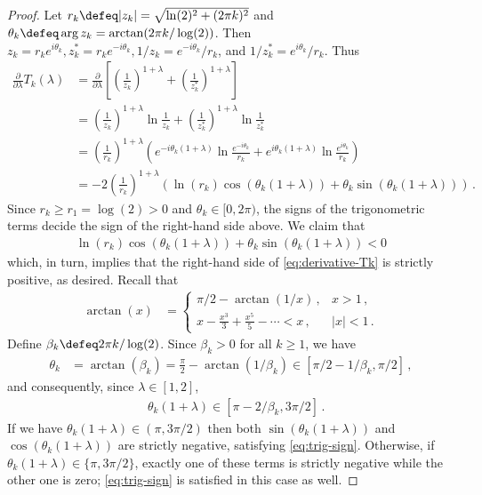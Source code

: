 \begin{proof}
    Let $r_k \defeq \vert z_k \vert = \sqrt{\ln(2)^2 + (2 \pi k)^2}$ and 
    $\theta_k \defeq \arg{z_k} = \arctan(2 \pi k/\log(2) )$. 
    Then $z_k = r_k e^{i \theta_k}, z_k^* = r_k e^{-i \theta_k}, 1/z_k = e^{-i \theta_k}/r_k$, 
    and $1/z_k^* = e^{i \theta_k}/r_k$. 
    Thus
    \begin{align}\label{eq:derivative-Tk}
        \frac{\partial}{\partial \lambda}T_k(\lambda)
        &= \frac{\partial}{\partial \lambda}\left[ 
        \left(\frac{1}{z_k} \right)^{1+\lambda} + 
        \left(\frac{1}{z_k^*}\right)^{1+\lambda}  \right] \nonumber \\
        &= \left(\frac{1}{z_k} \right)^{1+\lambda}\ln \frac{1}{z_k} + 
        \left(\frac{1}{z_k^*}\right)^{1+\lambda} \ln \frac{1}{z_k^*} \nonumber \\
        &=\left( \frac{1}{r_k}\right)^{1+\lambda}\left( 
            e^{-i \theta_k(1+\lambda)} \ln \frac{e^{-i \theta_k}}{r_k} +
            e^{i \theta_k(1+\lambda)} \ln \frac{e^{i \theta_k}}{r_k}
        \right) \nonumber \\
        &= -2 \left( \frac{1}{r_k}\right)^{1+\lambda}\left( 
            \ln(r_k) \cos(\theta_k(1+\lambda)) + \theta_k \sin (\theta_k(1+\lambda))
        \right) 
        \, .
    \end{align}
    Since $r_k \geq r_1 = \log(2) > 0$ and $\theta_k \in [0, 2\pi)$, 
    the signs of the trigonometric terms decide the sign 
    of the right-hand side above. 
    We claim that
    \begin{align}\label{eq:trig-sign}
        \ln(r_k) \cos(\theta_k(1+\lambda)) + \theta_k  \sin (\theta_k(1+\lambda))  < 0
    \end{align}
    which, in turn, implies that the right-hand side of
    \eqref{eq:derivative-Tk} is strictly positive, as desired. 
    Recall that 
    \begin{align*}
        \arctan(x) &= \begin{cases}
        \pi/2 - \arctan(1/x)\, , & x > 1\, , \\
        x - \frac{x^3}{3} + \frac{x^5}{5} - \cdots < x\, , & \vert x \vert < 1
        \, .
        \end{cases}
    \end{align*}
    Define $\beta_k \defeq 2 \pi k/\log(2)$. 
    Since $\beta_k > 0$ for all $k \geq 1$, we have
    \begin{align*}
        \theta_k &= \arctan(\beta_k) = \frac{\pi}{2} - \arctan(1/\beta_k) \in \left[ \pi/2 - 1/\beta_k, \pi/2 \right]
        \, ,
    \end{align*}
    and consequently, since $\lambda \in [1,2]$,
    \begin{align*}
        &\theta_k(1+\lambda) \in \left[ \pi - 2/\beta_k, 3\pi/2 \right]
        \, .
    \end{align*}
    If we have $ \theta_k(1+\lambda) \in (\pi,  3 \pi/2)$
    then both $\sin(\theta_k(1+\lambda)) $ and $\cos(\theta_k(1+\lambda))$ are strictly negative, 
    satisfying \eqref{eq:trig-sign}.
    Otherwise, if $\theta_k(1+\lambda) \in \{\pi, 3\pi/2\}$, exactly one of these terms is strictly negative 
    while the other one is zero;  \eqref{eq:trig-sign} is satisfied in this case as well.


\end{proof}
